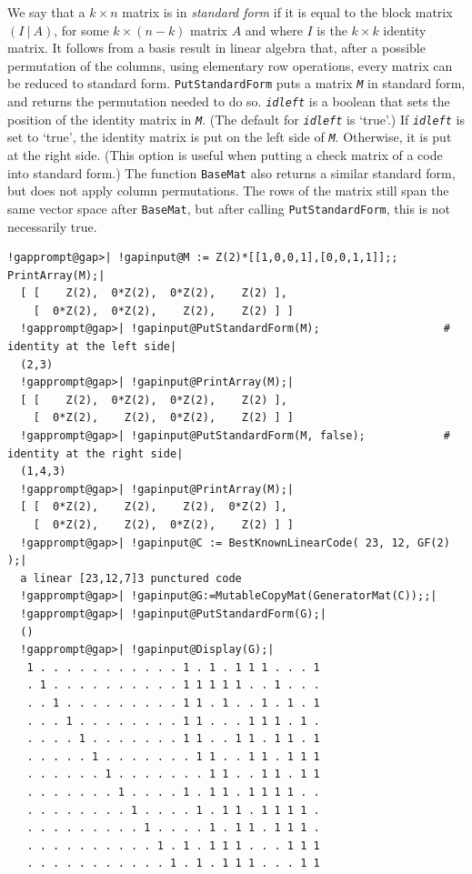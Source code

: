 \documentclass[a4paper,11pt]{report}
\begin{document}
{{{ We say that a $k\times n$ matrix is in \emph{standard form} if it is equal to the block matrix $(I\ |\ A)$, for some $k\times (n-k)$ matrix $A$ and where $I$ is the $k\times k$ identity matrix. It follows from a basis result in linear algebra that, after
a possible permutation of the columns, using elementary row operations, every
matrix can be reduced to standard form. \texttt{PutStandardForm} puts a matrix \mbox{\texttt{\mdseries\slshape M}} in standard form, and returns the permutation needed to do so. \mbox{\texttt{\mdseries\slshape idleft}} is a boolean that sets the position of the identity matrix in \mbox{\texttt{\mdseries\slshape M}}. (The default for \mbox{\texttt{\mdseries\slshape idleft}} is `true'.) If \mbox{\texttt{\mdseries\slshape idleft}} is set to `true', the identity matrix is put on the left side of \mbox{\texttt{\mdseries\slshape M}}. Otherwise, it is put at the right side. (This option is useful when putting
a check matrix of a code into standard form.) The function \texttt{BaseMat} also returns a similar standard form, but does not apply column permutations.
The rows of the matrix still span the same vector space after \texttt{BaseMat}, but after calling \texttt{PutStandardForm}, this is not necessarily true. }

 
\begin{Verbatim}[commandchars=!@|,fontsize=\small,frame=single,label=Example]
  !gapprompt@gap>| !gapinput@M := Z(2)*[[1,0,0,1],[0,0,1,1]];; PrintArray(M);|
  [ [    Z(2),  0*Z(2),  0*Z(2),    Z(2) ], 
    [  0*Z(2),  0*Z(2),    Z(2),    Z(2) ] ]
  !gapprompt@gap>| !gapinput@PutStandardForm(M);                   # identity at the left side|
  (2,3)
  !gapprompt@gap>| !gapinput@PrintArray(M);|
  [ [    Z(2),  0*Z(2),  0*Z(2),    Z(2) ],
    [  0*Z(2),    Z(2),  0*Z(2),    Z(2) ] ]
  !gapprompt@gap>| !gapinput@PutStandardForm(M, false);            # identity at the right side|
  (1,4,3)
  !gapprompt@gap>| !gapinput@PrintArray(M);|
  [ [  0*Z(2),    Z(2),    Z(2),  0*Z(2) ],
    [  0*Z(2),    Z(2),  0*Z(2),    Z(2) ] ]
  !gapprompt@gap>| !gapinput@C := BestKnownLinearCode( 23, 12, GF(2) );|
  a linear [23,12,7]3 punctured code
  !gapprompt@gap>| !gapinput@G:=MutableCopyMat(GeneratorMat(C));;|
  !gapprompt@gap>| !gapinput@PutStandardForm(G);|
  ()
  !gapprompt@gap>| !gapinput@Display(G);|
   1 . . . . . . . . . . . 1 . 1 . 1 1 1 . . . 1
   . 1 . . . . . . . . . . 1 1 1 1 1 . . 1 . . .
   . . 1 . . . . . . . . . 1 1 . 1 . . 1 . 1 . 1
   . . . 1 . . . . . . . . 1 1 . . . 1 1 1 . 1 .
   . . . . 1 . . . . . . . 1 1 . . 1 1 . 1 1 . 1
   . . . . . 1 . . . . . . . 1 1 . . 1 1 . 1 1 1
   . . . . . . 1 . . . . . . . 1 1 . . 1 1 . 1 1
   . . . . . . . 1 . . . . 1 . 1 1 . 1 1 1 1 . .
   . . . . . . . . 1 . . . . 1 . 1 1 . 1 1 1 1 .
   . . . . . . . . . 1 . . . . 1 . 1 1 . 1 1 1 .
   . . . . . . . . . . 1 . 1 . 1 1 1 . . . 1 1 1
   . . . . . . . . . . . 1 . 1 . 1 1 1 . . . 1 1
\end{Verbatim}
 

}}
\end{document}
